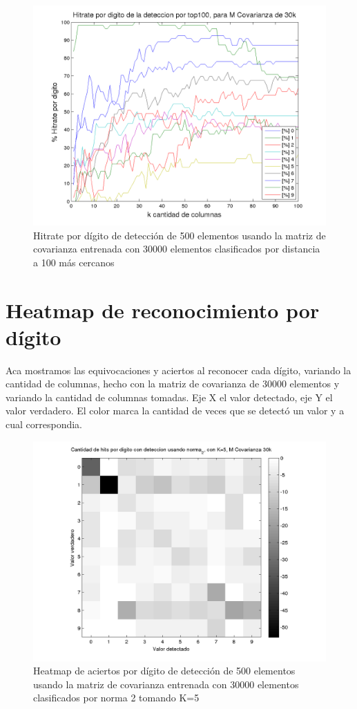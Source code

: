 \begin{figure}[H]
\begin {center}
\includegraphics[width=\pdwidth]{plots/pordig-30kcv-top100.png}
\end {center}
\caption{Hitrate por d\'igito de detecci\'on de 500 elementos usando la matriz de covarianza entrenada con 30000 elementos
clasificados por distancia a 100 m\'as cercanos}
\label{fig:HRD30kcv-dist100}
\end{figure}

\section{Heatmap de reconocimiento por d\'igito}
Aca mostramos las equivocaciones y aciertos al reconocer cada d\'igito, variando la cantidad de columnas, hecho con la matriz de covarianza de
30000 elementos y variando la cantidad de columnas tomadas. Eje X el valor detectado, eje Y el valor verdadero. El color marca la cantidad
de veces que se detect\'o un valor y a cual correspondia.
\def \hmwidth {500pt}
\begin{figure}[H]
\includegraphics[width=\hmwidth]{plots/heatmap-30kcv-k5-norma_2.png}
\caption{Heatmap de aciertos por d\'igito de detecci\'on de 500 elementos usando la matriz de covarianza entrenada con 30000 elementos
clasificados por norma 2 tomando K=5}
\label{fig:HM30kcv-k5}
\end{figure}

